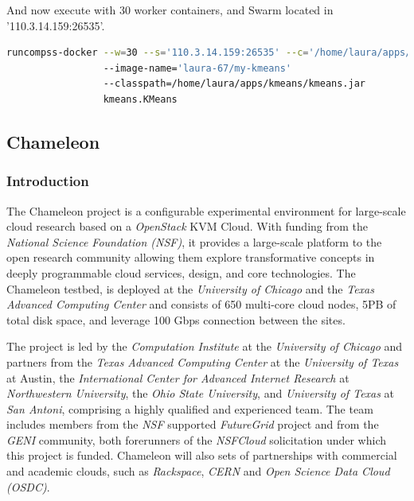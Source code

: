 And now execute with 30 worker containers, and Swarm located in '110.3.14.159:26535'.
\begin{lstlisting}[language=bash]
runcompss-docker --w=30 --s='110.3.14.159:26535' --c='/home/laura/apps/kmeans' 
                 --image-name='laura-67/my-kmeans'
                 --classpath=/home/laura/apps/kmeans/kmeans.jar
                 kmeans.KMeans
\end{lstlisting}           

\clearpage

\subsection{Chameleon}

\subsubsection{Introduction}

The Chameleon project is a configurable experimental environment for large-scale cloud research based on a \textit{OpenStack} 
KVM Cloud. With funding from the \textit{National Science Foundation (NSF)}, it provides a large-scale platform to the open research
community allowing them explore transformative concepts in deeply programmable cloud services, design, and core technologies. The 
Chameleon testbed, is deployed at the \textit{University of Chicago} and the \textit{Texas Advanced Computing Center} and consists of
650 multi-core cloud nodes, 5PB of total disk space, and leverage 100 Gbps connection between the sites. 

The project is led by the \textit{Computation Institute} at the \textit{University of Chicago} and partners from the \textit{Texas 
Advanced Computing Center} at the \textit{University of Texas} at Austin, the \textit{International Center for Advanced Internet 
Research} at \textit{Northwestern University}, the \textit{Ohio State University}, and \textit{University of Texas} at \textit{San
Antoni}, comprising a highly qualified and experienced team. The team includes members from the \textit{NSF} supported 
\textit{FutureGrid} project and from the \textit{GENI} community, both forerunners of the \textit{NSFCloud} solicitation under 
which this project is funded. Chameleon will also sets of partnerships with commercial and academic clouds, such as \textit{Rackspace},
\textit{CERN} and \textit{Open Science Data Cloud (OSDC)}.


